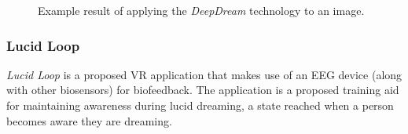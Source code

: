 \begin{figure}%
    \centering
    \quad
    \caption{Example result of applying the \textit{DeepDream} technology to an image.}%
    \label{fig:mordvintsev2015inceptionism}%
\end{figure}

\subsubsection{Lucid Loop}
\textit{Lucid Loop} \autocite{kitson2019lucid} is a proposed \ac{VR} application that makes use of an \ac{EEG} device (along with other biosensors) for biofeedback. The application is a proposed training aid for maintaining awareness during lucid dreaming, a state reached when a person becomes aware they are dreaming.

